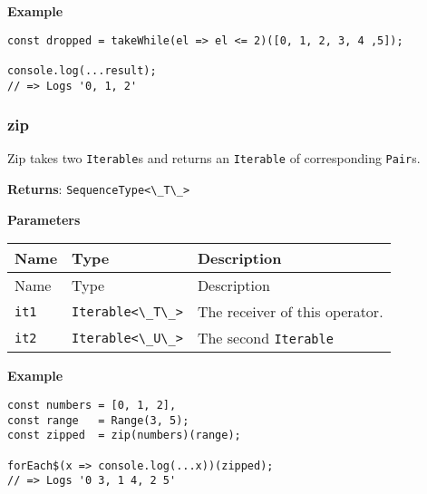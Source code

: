 \textbf{Example}

\begin{lstlisting}[label=643a92b4-09d7-4bc6-aa4b-dab46314eaa3]
const dropped = takeWhile(el => el <= 2)([0, 1, 2, 3, 4 ,5]);
                                                               
console.log(...result);
// => Logs '0, 1, 2'
\end{lstlisting}

\hypertarget{9bca8d6e-83f7-4964-87ac-3f1be94d150d}{%
\subsubsection{zip}\label{9bca8d6e-83f7-4964-87ac-3f1be94d150d}}

Zip takes two \passthrough{\lstinline!Iterable!}s and returns an
\passthrough{\lstinline!Iterable!} of corresponding
\passthrough{\lstinline!Pair!}s.

\textbf{Returns}: \passthrough{\lstinline!SequenceType<\_T\_>!}

\textbf{Parameters}

\begin{longtable}[]{
  >{\raggedright\arraybackslash}p{}
  >{\raggedright\arraybackslash}p{}
  >{\raggedright\arraybackslash}p{}@{}}

\toprule\noalign{}
Name & Type & Description \\
\midrule\noalign{}
\endfirsthead
\toprule\noalign{}
Name & Type & Description \\
\midrule\noalign{}
\endhead
\bottomrule\noalign{}
\endlastfoot
\passthrough{\lstinline!it1!} &
\passthrough{\lstinline!Iterable<\_T\_>!} & The receiver of this
operator. \\
\passthrough{\lstinline!it2!} &
\passthrough{\lstinline!Iterable<\_U\_>!} & The second
\passthrough{\lstinline!Iterable!} \\
\end{longtable}

\textbf{Example}

\begin{lstlisting}[label=960fcdca-f1f5-465e-a398-6966c47e3f02]
const numbers = [0, 1, 2],
const range   = Range(3, 5);
const zipped  = zip(numbers)(range);
                                         
forEach$(x => console.log(...x))(zipped);
// => Logs '0 3, 1 4, 2 5'
\end{lstlisting}

